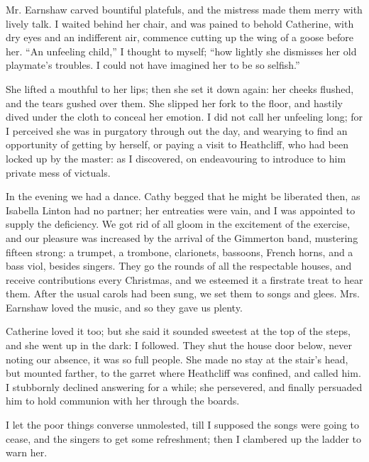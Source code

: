 \par Mr. Earnshaw carved bountiful platefuls, and the mistress made them merry with lively talk. I waited behind her chair, and was pained to behold Catherine, with dry eyes and an indifferent air, commence cutting up the wing of a goose before her. “An unfeeling child,” I thought to myself; “how lightly she dismisses her old playmate's troubles. I could not have imagined her to be so selfish.”
\par She lifted a mouthful to her lips; then she set it down again: her cheeks flushed, and the tears gushed over them. She slipped her fork to the floor, and hastily dived under the cloth to conceal her emotion. I did not call her unfeeling long; for I perceived she was in purgatory through out the day, and wearying to find an opportunity of getting by herself, or paying a visit to Heathcliff, who had been locked up by the master: as I discovered, on endeavouring to introduce to him private mess of victuals.
\par In the evening we had a dance. Cathy begged that he might be liberated then, as Isabella Linton had no partner; her entreaties were vain, and I was appointed to supply the deficiency. We got rid of all gloom in the excitement of the exercise, and our pleasure was increased by the arrival of the Gimmerton band, mustering fifteen strong: a trumpet, a trombone, clarionets, bassoons, French horns, and a bass viol, besides singers. They go the rounds of all the respectable houses, and receive contributions every Christmas, and we esteemed it a firstrate treat to hear them. After the usual carols had been sung, we set them to songs and glees. Mrs. Earnshaw loved the music, and so they gave us plenty.
\par Catherine loved it too; but she said it sounded sweetest at the top of the steps, and she went up in the dark: I followed. They shut the house door below, never noting our absence, it was so full people. She made no stay at the stair's head, but mounted farther, to the garret where Heathcliff was confined, and called him. I stubbornly declined answering for a while; she persevered, and finally persuaded him to hold communion with her through the boards.
\par I let the poor things converse unmolested, till I supposed the songs were going to cease, and the singers to get some refreshment; then I clambered up the ladder to warn her.
